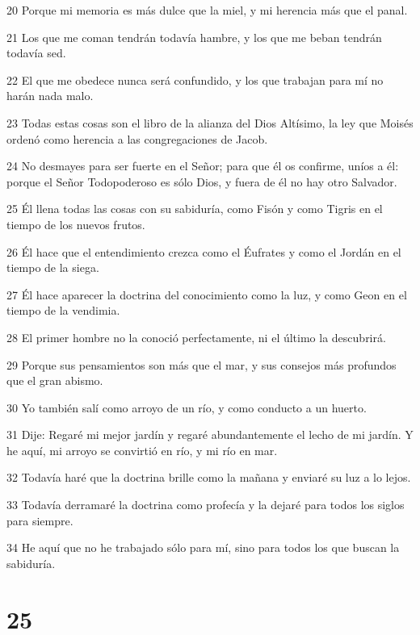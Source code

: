 \par 20 Porque mi memoria es más dulce que la miel, y mi herencia más que el panal.
\par 21 Los que me coman tendrán todavía hambre, y los que me beban tendrán todavía sed.
\par 22 El que me obedece nunca será confundido, y los que trabajan para mí no harán nada malo.
\par 23 Todas estas cosas son el libro de la alianza del Dios Altísimo, la ley que Moisés ordenó como herencia a las congregaciones de Jacob.
\par 24 No desmayes para ser fuerte en el Señor; para que él os confirme, uníos a él: porque el Señor Todopoderoso es sólo Dios, y fuera de él no hay otro Salvador.
\par 25 Él llena todas las cosas con su sabiduría, como Fisón y como Tigris en el tiempo de los nuevos frutos.
\par 26 Él hace que el entendimiento crezca como el Éufrates y como el Jordán en el tiempo de la siega.
\par 27 Él hace aparecer la doctrina del conocimiento como la luz, y como Geon en el tiempo de la vendimia.
\par 28 El primer hombre no la conoció perfectamente, ni el último la descubrirá.
\par 29 Porque sus pensamientos son más que el mar, y sus consejos más profundos que el gran abismo.
\par 30 Yo también salí como arroyo de un río, y como conducto a un huerto.
\par 31 Dije: Regaré mi mejor jardín y regaré abundantemente el lecho de mi jardín. Y he aquí, mi arroyo se convirtió en río, y mi río en mar.
\par 32 Todavía haré que la doctrina brille como la mañana y enviaré su luz a lo lejos.
\par 33 Todavía derramaré la doctrina como profecía y la dejaré para todos los siglos para siempre.
\par 34 He aquí que no he trabajado sólo para mí, sino para todos los que buscan la sabiduría.

\chapter{25}

